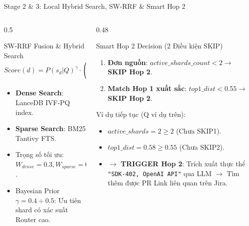 \documentclass[aspectratio=169,10pt]{beamer}
\begin{document}
\begin{frame}{Stage 2 \& 3: Local Hybrid Search, SW-RRF \& Smart Hop 2}
\small
\begin{columns}[T]
\begin{column}{0.5\textwidth}
\begin{block}{SW-RRF Fusion \& Hybrid Search}
$$\boxed{Score(d) = P(s_d|Q)^\gamma \cdot \left( \frac{W_{dense}}{k + r_{dense}} + \frac{W_{sparse}}{k + r_{sparse}} \right)}$$
\begin{itemize}
    \item \textbf{Dense Search}: LanceDB IVF-PQ index.
    \item \textbf{Sparse Search}: BM25 Tantivy FTS.
    \item Trọng số tối ưu: $W_{dense}=0.3, W_{sparse}=0.7$.
    \item Bayesian Prior $\gamma=0.4 \div 0.5$: Ưu tiên shard có xác suất Router cao.
\end{itemize}
\end{block}
\end{column}
\begin{column}{0.48\textwidth}
\begin{alertblock}{Smart Hop 2 Decision (2 Điều kiện SKIP)}
\begin{enumerate}
    \item \textbf{Đơn nguồn}: $active\_shards\_count < 2 \rightarrow$ \textbf{SKIP Hop 2}.
    \item \textbf{Match Hop 1 xuất sắc}: $top1\_dist < 0.55 \rightarrow$ \textbf{SKIP Hop 2}.
\end{enumerate}
\end{alertblock}

\begin{exampleblock}{Ví dụ tiếp tục (Q ví dụ trên):}
\begin{itemize}
    \item $active\_shards = 2 \ge 2$ (Chưa SKIP1).
    \item $top1\_dist = 0.58 \ge 0.55$ (Chưa SKIP2).
    \item $\rightarrow$ \textbf{TRIGGER Hop 2}: Trích xuất thực thể \texttt{"SDK-402, OpenAI API"} qua LLM $\rightarrow$ Tìm thêm được PR Link liên quan trên Jira.
\end{itemize}
\end{exampleblock}
\end{column}
\end{columns}
\end{frame}
\end{document}
